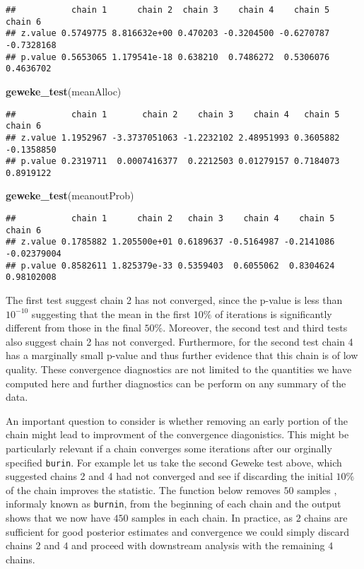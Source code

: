 \documentclass[]{article}
\newenvironment{Shaded}{\begin{snugshade}}{\end{snugshade}}
\newcommand{\KeywordTok}[1]{\textcolor[rgb]{0.13,0.29,0.53}{\textbf{{#1}}}}
\newcommand{\NormalTok}[1]{{#1}}
\begin{document}
\begin{verbatim}
##           chain 1      chain 2  chain 3    chain 4    chain 5    chain 6
## z.value 0.5749775 8.816632e+00 0.470203 -0.3204500 -0.6270787 -0.7328168
## p.value 0.5653065 1.179541e-18 0.638210  0.7486272  0.5306076  0.4636702
\end{verbatim}

\begin{Shaded}
\begin{Highlighting}[]
\KeywordTok{geweke_test}\NormalTok{(meanAlloc)}
\end{Highlighting}
\end{Shaded}

\begin{verbatim}
##           chain 1       chain 2    chain 3    chain 4   chain 5    chain 6
## z.value 1.1952967 -3.3737051063 -1.2232102 2.48951993 0.3605882 -0.1358850
## p.value 0.2319711  0.0007416377  0.2212503 0.01279157 0.7184073  0.8919122
\end{verbatim}

\begin{Shaded}
\begin{Highlighting}[]
\KeywordTok{geweke_test}\NormalTok{(meanoutProb)}
\end{Highlighting}
\end{Shaded}

\begin{verbatim}
##           chain 1      chain 2   chain 3    chain 4    chain 5     chain 6
## z.value 0.1785882 1.205500e+01 0.6189637 -0.5164987 -0.2141086 -0.02379004
## p.value 0.8582611 1.825379e-33 0.5359403  0.6055062  0.8304624  0.98102008
\end{verbatim}

The first test suggest chain 2 has not converged, since the p-value is
less than \(10^{-10}\) suggesting that the mean in the first \(10\%\) of
iterations is significantly different from those in the final \(50\%\).
Moreover, the second test and third tests also suggest chain 2 has not
converged. Furthermore, for the second test chain 4 has a marginally
small p-value and thus further evidence that this chain is of low
quality. These convergence diagnostics are not limited to the quantities
we have computed here and further diagnostics can be perform on any
summary of the data.

An important question to consider is whether removing an early portion
of the chain might lead to improvment of the convergence diagonistics.
This might be particularly relevant if a chain converges some iterations
after our orginally specified \texttt{burin}. For example let us take
the second Geweke test above, which suggested chains 2 and 4 had not
converged and see if discarding the initial \(10\%\) of the chain
improves the statistic. The function below removes \(50\) samples ,
informaly known as \texttt{burnin}, from the beginning of each chain and
the output shows that we now have \(450\) samples in each chain. In
practice, as \(2\) chains are sufficient for good posterior estimates
and convergence we could simply discard chains \(2\) and \(4\) and
proceed with downstream analysis with the remaining \(4\) chains.
\end{document}
